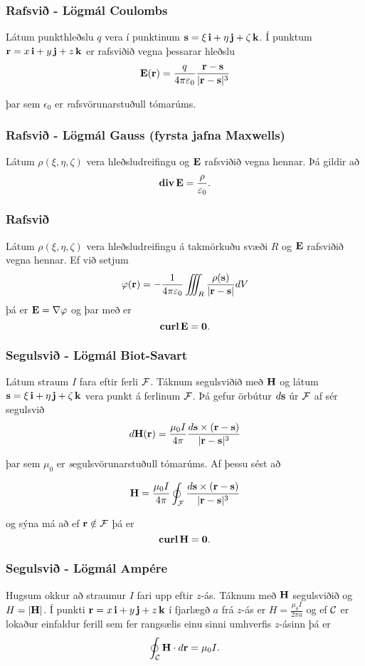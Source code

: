 \subsubsection{Rafsvið \rtask{} - Lögmál Coulombs }
 Látum punkthleðslu $q$ vera í punktinum $\mbox{${\bf s}$}=\xi\,\mbox{${\bf i}$}+\eta\,\mbox{${\bf j}$}+\zeta\,\mbox{${\bf k}$}$.   Í punktum $\mbox{${\bf r}$}=x\,\mbox{${\bf i}$}+y\,\mbox{${\bf j}$}+z\,\mbox{${\bf k}$}$ er rafsviðið vegna þessarar hleðslu
$$\mbox{${\bf E}$}(\mbox{${\bf r}$})=\frac{q}{4\pi\varepsilon_0}\frac{\mbox{${\bf r}$}-\mbox{${\bf s}$}}{|\mbox{${\bf r}$}-\mbox{${\bf s}$}|^3}$$

þar sem $\epsilon_0$ er {\emph rafsvörunarstuðull} tómarúms.



\subsubsection{Rafsvið  \rtask{} - Lögmál Gauss (fyrsta jafna Maxwells)}
 Látum $\rho(\xi,\eta,\zeta)$ vera hleðsludreifingu og $\mbox{${\bf E}$}$ rafsviðið vegna hennar.  Þá gildir að 
$$\mbox{${\rm\bf div\,}$}\mbox{${\bf E}$}=\frac{\rho}{\varepsilon_0}.$$

\subsubsection{Rafsvið \rtask{}}
 Látum $\rho(\xi,\eta,\zeta)$ vera hleðsludreifingu á takmörkuðu svæði $R$ og $\mbox{${\bf E}$}$ rafsviðið vegna hennar.  Ef við setjum
 $$ \varphi(\mbox{${\bf r}$}) = -\frac{1}{4 \pi \varepsilon_0} \iiint_R \frac{\rho(\mbox{${\bf s}$})}{|\mbox{${\bf r}$}-\mbox{${\bf s}$}|} dV$$
 þá er $\mbox{${\bf E}$} = \nabla \varphi$ og þar með er 
$$\mbox{${\rm\bf curl\,}$} \mbox{${\bf E}$}= \mathbf{0}.$$


 

\subsubsection{Segulsvið \rtask{} - Lögmál Biot-Savart }
 Látum straum $I$ fara eftir ferli $\cal F$.  Táknum segulsviðið með $\mbox{${\bf H}$}$ og látum $\mbox{${\bf s}$}=\xi\,\mbox{${\bf i}$}+\eta\,\mbox{${\bf j}$}+\zeta\,\mbox{${\bf k}$}$ vera punkt á ferlinum $\cal F$.  Þá gefur örbútur $d\mbox{${\bf s}$}$ úr $\cal F$ af sér segulsvið 
$$d\mbox{${\bf H}$}(\mbox{${\bf r}$})=\frac{\mu_0 I}{4\pi}\frac{d\mbox{${\bf s}$}\times(\mbox{${\bf r}$}-\mbox{${\bf s}$})}{|\mbox{${\bf r}$}-\mbox{${\bf s}$}|^3}$$

þar sem $\mu_0$ er {\emph segulsvörunarstuðull} tómarúms. Af þessu sést að 


$$\mbox{${\bf H}$}=\frac{\mu_0 I}{4\pi}\oint_{\cal F}
\frac{d\mbox{${\bf s}$}\times(\mbox{${\bf r}$}-\mbox{${\bf s}$})}{|\mbox{${\bf r}$}-\mbox{${\bf s}$}|^3}$$

og sýna má að ef $\mbox{${\bf r}$} \notin \mathcal{F}$ þá er $$\mbox{${\rm\bf curl\,}$} \mbox{${\bf H}$} = \mathbf{0}.$$




\subsubsection{Segulsvið \rtask{} - Lögmál Ampére}
 Hugsum okkur að straumur $I$ fari upp eftir $z$-ás.  Táknum með $\mbox{${\bf H}$}$ segulsviðið og $H=|\mbox{${\bf H}$}|$.  Í punkti  $\mbox{${\bf r}$}=x\,\mbox{${\bf i}$}+y\,\mbox{${\bf j}$}+z\,\mbox{${\bf k}$}$ í fjarlægð $a$ frá $z$-ás er $H=\frac{\mu_0 I}{2\pi a}$ og ef $\cal C$ er lokaður einfaldur ferill sem fer rangsælis einu sinni umhverfis $z$-ásinn þá er 
$$\oint_{\cal C} \mbox{${\bf H}$}\cdot d\mbox{${\bf r}$}=\mu_0 I.$$

